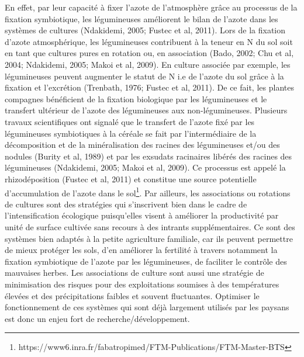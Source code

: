 \documentclass[a4paper,11pt]{article}
\begin{document}
En effet, par leur capacité à fixer l’azote de l’atmosphère grâce au
processus de la fixation symbiotique, les légumineuses améliorent le
bilan de l’azote dans les systèmes de cultures (Ndakidemi, 2005;
Fustec et al, 2011). Lors de la fixation d’azote atmosphérique, les
légumineuses contribuent à la teneur en N du sol soit en tant que
cultures pures en rotation ou, en association (Bado, 2002; Chu et al,
2004; Ndakidemi, 2005; Makoi et al, 2009). En culture associée par
exemple, les légumineuses peuvent augmenter le statut de N i.e de
l’azote du sol grâce à la fixation et l’excrétion (Trenbath, 1976;
Fustec et al, 2011). De ce fait, les plantes compagnes bénéficient de
la fixation biologique par les légumineuses et le transfert ultérieur
de l’azote des légumineuses aux non-légumineuses. Plusieurs travaux
scientifiques ont signalé que le transfert de l’azote fixé par les
légumineuses symbiotiques à la céréale se fait par l’intermédiaire de
la décomposition et de la minéralisation des racines des légumineuses
et/ou des nodules (Burity et al, 1989) et par les exsudats racinaires
libérés des racines des légumineuses (Ndakidemi, 2005; Makoi et al,
2009). Ce processus est appelé la rhizodéposition (Fustec et al, 2011)
et constitue une source potentielle d’accumulation de l’azote dans le
sol\footnote{https://www6.inra.fr/fabatropimed/FTM-Publications/FTM-Master-BTS}.
Par ailleurs, les associations ou rotations de cultures sont
des stratégies qui s’inscrivent bien dans le cadre de
l’intensification écologique puisqu’elles visent à améliorer la
productivité par unité de surface cultivée sans recours à des intrants
supplémentaires. Ce sont des systèmes bien adaptés à la petite
agriculture familiale, car ils peuvent permettre de mieux protéger les
sols, d’en améliorer la fertilité à travers notamment la fixation
symbiotique de l’azote par les légumineuses, de faciliter le contrôle
des mauvaises herbes. Les associations de culture sont aussi une
stratégie de minimisation des risques pour des exploitations soumises
à des températures élevées et des précipitations faibles et souvent
fluctuantes. Optimiser le fonctionnement de ces systèmes qui sont déjà
largement utilisés par les paysans est donc un enjeu fort de
recherche/développement.

\newpage

 
  
\end{document}
